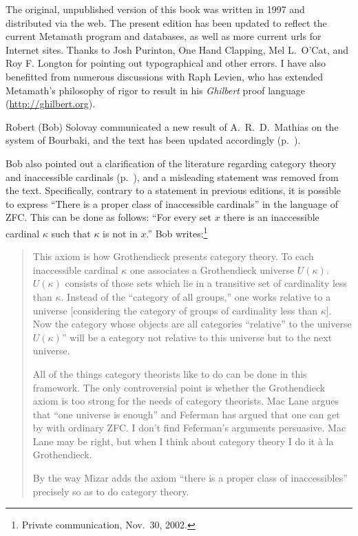 The original, unpublished version of this book was written in 1997 and
distributed via the web.  The present edition has been updated to
reflect the current Metamath program and databases, as well as more
current {\sc url}s for Internet sites.  Thanks to Josh
Purinton, One Hand
Clapping, Mel L.\ O'Cat, and Roy F. Longton for pointing out
typographical and other errors.  I have also benefitted from numerous
discussions with Raph Levien, who has extended
Metamath's philosophy of rigor to result in his {\em
Ghilbert} proof language (\url{http://ghilbert.org}).

Robert (Bob) Solovay communicated a new result of
A.~R.~D.~Mathias on the system of Bourbaki, and the text has been
updated accordingly (p.~\pageref{bourbaki}).

Bob also pointed out a clarification of the literature regarding
category theory and inaccessible cardinals (p.~\pageref{categoryth}),
and a misleading statement was removed from the text.  Specifically,
contrary to a statement in previous editions, it is possible to express
``There is a proper class of inaccessible cardinals'' in the language of
ZFC.  This can be done as follows:  ``For every set $x$ there is an
inaccessible cardinal $\kappa$ such that $\kappa$ is not in $x$.''
Bob writes:\footnote{Private communication, Nov.~30, 2002.}
\begin{quotation}
     This axiom is how Grothendieck presents category theory.  To each
inaccessible cardinal $\kappa$ one associates a Grothendieck universe
 $U(\kappa)$.  $U(\kappa)$ consists of
those sets which lie in a transitive set of cardinality less than
$\kappa$.  Instead of the ``category of all groups,'' one works relative
to a universe [considering the category of groups of cardinality less
than $\kappa$].  Now the category whose objects are all categories
``relative'' to the universe $U(\kappa)$'' will be a category not
relative to this universe but to the next universe.

     All of the things category theorists like to do can be done in this
framework.  The only controversial point is whether the Grothen\-dieck
axiom is too strong for the needs of category theorists.  Mac Lane
 argues that ``one universe is enough'' and
Feferman has argued that one can get by with
ordinary ZFC.  I don't find Feferman's arguments persuasive.  Mac Lane
may be right, but when I think about category theory I do it \`{a} la
Grothendieck.

        By the way Mizar adds the axiom ``there is a proper
class of inaccessibles'' precisely so as to do category theory.
\end{quotation}

